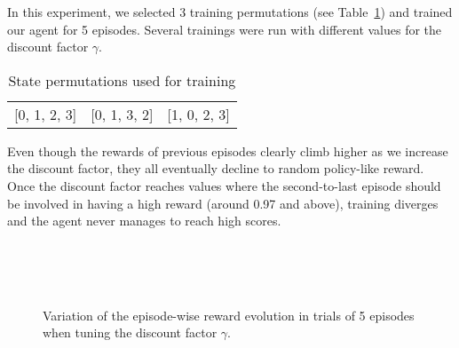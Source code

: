 In this experiment, we selected 3 training permutations (see 
Table~\ref{tab:5perms}) and trained our agent for 5 episodes. Several trainings
were run with different values for the discount factor $\gamma$.\\

\begin{table}
	\centering
	\caption{State permutations used for training}
	\label{tab:5perms}
	\bgroup
	\def\arraystretch{1.5}
	\begin{tabular}{c|c|c}
		[0, 1, 2, 3] & [0, 1, 3, 2] & [1, 0, 2, 3] \\
	\end{tabular}
	\egroup
\end{table}

Even though the rewards of previous episodes clearly climb higher as
we increase the discount factor, they all eventually decline to random
policy-like reward. Once the discount factor reaches values where the
second-to-last episode should be involved in having a high reward (around
0.97 and above), training diverges and the agent never manages to reach
high scores.\\

\begin{figure}
	\centering
	\\
	\\
	\\
	\caption{Variation of the episode-wise reward evolution in trials of 5
	episodes when tuning the discount factor $\gamma$.}
	\label{fig:varied_gamma}
\end{figure}


